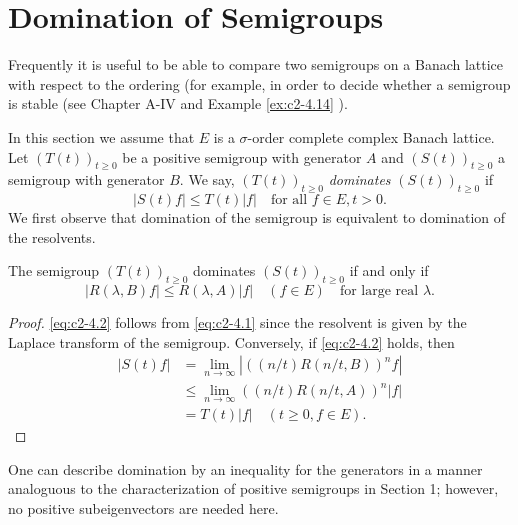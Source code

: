 \section{Domination of Semigroups} \label{sec:c2-4}
Frequently it is useful to be able to compare two semigroups on a
Banach lattice with respect to the ordering (for example, in order to
decide whether a semigroup is stable (see Chapter A-IV and Example \ref{ex:c2-4.14}   ).

In this section we assume that $E$ is a $\sigma$-order complete complex Banach lattice. 
Let $(T(t))_{t \geq 0}$ be a positive semigroup with generator $A$ and $(S(t))_{t \geq 0}$ a semigroup with generator $B$. 
We say, $(T(t))_{t \geq 0}$ \emph{dominates} $(S(t))_{t \geq 0}$ if
\begin{equation}\label{eq:c2-4.1}
|S(t)f| \leq T(t)|f| \quad \text{for all } f \in E, t > 0.
\end{equation}
We first observe that domination of the semigroup is equivalent to domination of the resolvents.
\begin{proposition}\label{prop:c2-4.1}
The semigroup $(T(t))_{t \geq 0}$ dominates $(S(t))_{t \geq 0}$ if and only if
\begin{equation}\label{eq:c2-4.2}
|R(\lambda,B)f| \leq R(\lambda,A)|f| \quad (f \in E) \quad \text{for large real }  \lambda.
\end{equation}
\end{proposition}
\begin{proof}
\eqref{eq:c2-4.2} follows from \eqref{eq:c2-4.1} since the resolvent is given by the Laplace transform of the semigroup. 
Conversely, if \eqref{eq:c2-4.2} holds, then
\begin{align*}
|S(t)f| &= \lim_{n \to \infty} |((n/t)R(n/t,B))^{n}f|\\
&\leq \lim_{n \to \infty} ((n/t)R(n/t,A))^{n}|f|\\
&= T(t)|f| \quad (t \geq 0, f \in E).
\end{align*}
\phantom{x}
\end{proof}
One can describe domination by an inequality for the generators in a manner analoguous to the characterization of positive semigroups in Section 1; however, no positive subeigenvectors are needed here.

